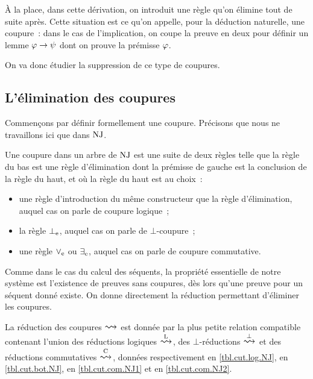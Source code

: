 \`A la place, dans cette dérivation, on introduit une règle qu'on élimine tout
de suite après. Cette situation est ce qu'on appelle, pour la déduction
naturelle, une coupure~: dans le cas de l'implication, on coupe la preuve en
deux pour définir un lemme $\varphi \to \psi$ dont on prouve la prémisse
$\varphi$.

On va donc étudier la suppression de ce type de coupures.

\subsection{L'élimination des coupures}

Commençons par définir formellement une coupure. Précisons que nous ne
travaillons ici que dans $\operatorname{NJ}$.

\begin{definition}
  Une coupure dans un arbre de $\operatorname{NJ}$ est une suite de deux règles telle que
  la règle du bas est une règle d'élimination dont la prémisse de gauche est
  la conclusion de la règle du haut, et où la règle du haut est au choix~:
  \begin{itemize}
  \item une règle d'introduction du même constructeur que la règle
    d'élimination, auquel cas on parle de coupure logique~;
  \item la règle $\bot_{\mathrm{e}}$, auquel cas on parle de $\bot$-coupure~;
  \item une règle $\mathord{\lor}_{\mathrm{e}}$ ou $\mathord{\exists}_{\mathrm{e}}$, auquel cas on parle de coupure
    commutative.
  \end{itemize}
\end{definition}

Comme dans le cas du calcul des séquents, la propriété essentielle de notre
système est l'existence de preuves sans coupures, dès lors qu'une preuve pour
un séquent donné existe. On donne directement la réduction permettant d'éliminer
les coupures.

\begin{definition}
  La réduction des coupures $\reecr{}$ est donnée
  par la plus petite relation compatible contenant l'union des réductions
  logiques $\LCut$, des $\bot$-réductions $\BCut$ et des réductions
  commutatives $\CCut$, données respectivement en \cref{tbl.cut.log.NJ},
  en \cref{tbl.cut.bot.NJ}, en \cref{tbl.cut.com.NJ1} et en
  \cref{tbl.cut.com.NJ2}.
\end{definition}

